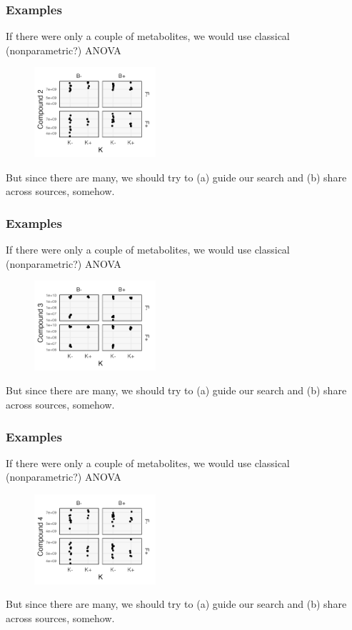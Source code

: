 \documentclass[hyperref={colorlinks=true, linkcolor=violet, citecolor=SeaGreen}]{beamer}
\begin{document}
\begin{frame}
  \frametitle{Examples}
    If there were only a couple of metabolites, we would use classical
    (nonparametric?) ANOVA
  \begin{figure}
    \includegraphics[width=0.4\textwidth]{compound-2}
  \end{figure}

    But since there are many, we should try to (a) guide our search and (b)
    share across sources, somehow.
\end{frame}

\begin{frame}
  \frametitle{Examples}
    If there were only a couple of metabolites, we would use classical
    (nonparametric?) ANOVA
  \begin{figure}
    \includegraphics[width=0.4\textwidth]{compound-3}
  \end{figure}

    But since there are many, we should try to (a) guide our search and (b)
    share across sources, somehow.
\end{frame}

\begin{frame}
  \frametitle{Examples}
    If there were only a couple of metabolites, we would use classical
    (nonparametric?) ANOVA
  \begin{figure}
    \includegraphics[width=0.4\textwidth]{compound-4}
  \end{figure}

    But since there are many, we should try to (a) guide our search and (b)
    share across sources, somehow.
\end{frame}
\end{document}
